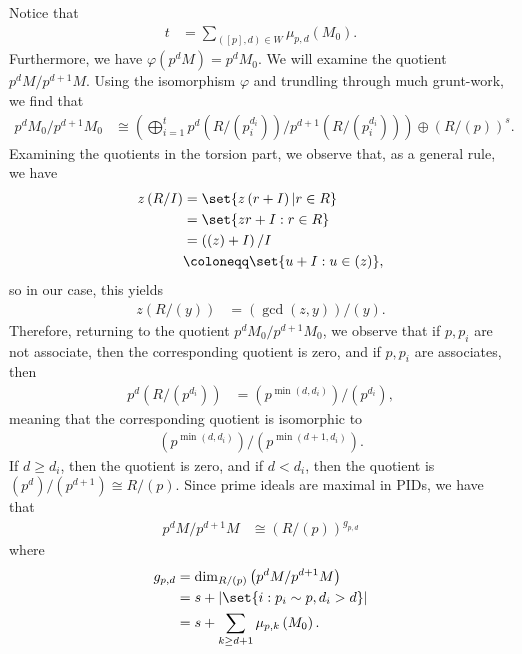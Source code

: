 \documentclass[10pt]{mypackage}
\renewcommand{\coloneq}{\coloneqq}
\begin{document}
Notice that
\begin{align*}
  t &= \sum_{\left( \left[ p \right],d \right)\in W} \mu_{p,d}\left( M_0 \right).
\end{align*}
Furthermore, we have $\varphi\left( p^{d}M \right) = p^{d}M_0$. We will examine the quotient $p^{d}M/p^{d+1}M$. Using the isomorphism $\varphi$ and trundling through much grunt-work, we find that
\begin{align*}
  p^{d}M_0/p^{d+1}M_0 &\cong \left( \bigoplus_{i=1}^{t} p^{d}\left( R/\left( p_i^{d_i} \right) \right)/p^{d+1}\left( R/\left( p_i^{d_i} \right) \right) \right) \oplus \left( R/\left( p \right) \right)^{s}.
\end{align*}
Examining the quotients in the torsion part, we observe that, as a general rule, we have
\begin{align*}
  z\left( R/I \right) &= \set{z\left( r + I \right)| r\in R}\\
                      &= \set{zr + I : r\in R}\\
                      &= \left( \left( z \right) + I \right)/I\\
                      &\coloneq \set{u + I : u\in \left( z \right)},
\end{align*}
so in our case, this yields
\begin{align*}
  z\left( R/\left( y \right) \right) &= \left( \gcd\left( z,y \right) \right)/\left( y \right).
\end{align*}
Therefore, returning to the quotient $p^{d}M_0/p^{d+1}M_0$, we observe that if $p,p_i$ are not associate, then the corresponding quotient is zero, and if $p,p_i$ are associates, then
\begin{align*}
  p^{d}\left( R/\left( p^{d_i} \right) \right) &= \left( p^{\min\left( d,d_i \right)} \right)/\left( p^{d_i} \right),
\end{align*}
meaning that the corresponding quotient is isomorphic to
\begin{align*}
  \left( p^{\min\left( d,d_i \right)} \right)/\left( p^{\min\left( d+1,d_i \right)} \right).
\end{align*}
If $d\geq d_i$, then the quotient is zero, and if $d < d_i$, then the quotient is $\left( p^{d} \right)/\left( p^{d+1} \right)\cong R/\left( p \right)$. Since prime ideals are maximal in PIDs, we have that
\begin{align*}
  p^{d}M/p^{d+1}M &\cong \left( R/\left( p \right) \right)^{g_{p,d}}
\end{align*}
where
\begin{align*}
  g_{p,d} &= \dim_{R/\left( p \right)}\left( p^{d}M/p^{d+1}M \right)\\
          &= s + \left\vert \set{i : p_i\sim p,d_i > d} \right\vert\\
          &= s + \sum_{k\geq d+1}\mu_{p,k}\left( M_0 \right).
\end{align*}
\end{document}
